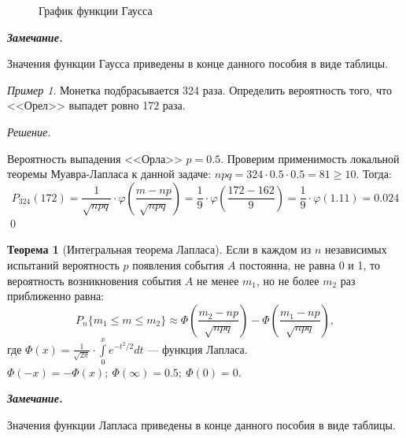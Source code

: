 \documentclass[12pt,a4paper]{article}
\theoremstyle{definition}
\theoremstyle{definition}
\newtheorem{theorem}{Теорема}[section]
\theoremstyle{remark}
\newenvironment{remark}{
  \par\noindent\textbf{\textit{Замечание.}}~
}{\par}
\theoremstyle{corollary}
\theoremstyle{bolditalic}
\newtheorem{example}{Пример}[section]
\newenvironment{solution}{
    \vspace{0.5em}
    \noindent\textit{Решение.}
}{\qed\vspace{1em}}
\begin{document}
\begin{figure}[H]
\centering
{}
\caption{График функции Гаусса}
\end{figure}

\begin{remark}
    Значения функции Гаусса приведены в конце данного пособия в виде таблицы. 
\end{remark}

\begin{example}
    Монетка подбрасывается 324 раза. Определить вероятность того, что <<Орел>> выпадет ровно 172 раза.
\end{example}

\begin{solution}
    Вероятность выпадения <<Орла>> $p=0.5$. Проверим применимость локальной теоремы Муавра-Лапласа к данной задаче: $npq=324\cdot 0.5\cdot 0.5=81\ge10$. Тогда:
    \[
    P_{324}(172)=\frac{1}{\sqrt{npq}}\cdot\varphi\left(\frac{m-np}{\sqrt{npq}}\right)=\frac{1}{9}\cdot \varphi\left(\frac{172-162}{9}\right)=\frac{1}{9}\cdot \varphi(1.11)=0.024
    \]
\end{solution}


\begin{theorem}[Интегральная теорема Лапласа]
    Если в каждом из $n$ независимых испытаний вероятность $p$ появления события $A$ постоянна, не равна 0 и 1, то вероятность возникновения события $A$ не менее $m_1$, но не более $m_2$ раз приближенно равна:
    \[
    P_n\{m_1\le m\le m_2\} \approx \Phi\left(\frac{m_2-np}{\sqrt{npq}}\right) - \Phi\left(\frac{m_1-np}{\sqrt{npq}}\right),
    \]
    где $\Phi(x)=\frac{1}{\sqrt{2\pi}}\cdot\int\limits_{0}^{x}{e^{-t^2/2}dt}$ --- функция Лапласа. $\Phi(-x)=-\Phi(x);\ \Phi(\infty)=0.5;\ \Phi(0)=0$.
\end{theorem}


\begin{remark}
    Значения функции Лапласа приведены в конце данного пособия в виде таблицы. 
\end{remark}
\end{document}
